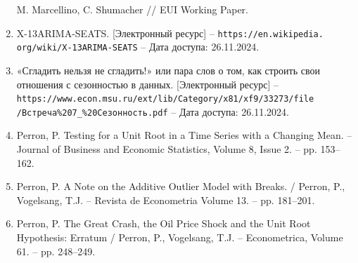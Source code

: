 \documentclass[a4paper, 14pt]{extreport}
\numberwithin{equation}{subsection}
\numberwithin{equation}{section}
\begin{document}
\begin{enumerate}
		M. Marcellino, C. Shumacher // EUI Working Paper.
		\item X-13ARIMA-SEATS. [Электронный ресурс] – \texttt{https://en.wikipedia.
		org/wiki/X-13ARIMA-SEATS} – Дата доступа: 26.11.2024.
		\item «Сгладить нельзя не сгладить!» или пара слов о том, как строить
		свои отношения с сезонностью в данных. [Электронный ресурс] –
		\texttt{https://www.econ.msu.ru/ext/lib/Category/x81/xf9/33273/file\\/Встреча\%207\_\%20Сезонность.pdf} – Дата доступа:
		26.11.2024.
		\item Perron, P. Testing for a Unit Root in a Time Series with a Changing Mean. –
		Journal of Business and Economic Statistics, Volume 8, Issue 2. – pp. 153–162.
		\item Perron, P. A Note on the Additive Outlier Model with Breaks. / Perron, P.,
		Vogelsang, T.J. – Revista de Econometria Volume 13. – pp. 181–201.
		\item Perron, P. The Great Crash, the Oil Price Shock and the Unit Root
		Hypothesis: Erratum / Perron, P., Vogelsang, T.J. – Econometrica, Volume 61.
		– pp. 248–249.
	\end{enumerate}
	
\end{document}
